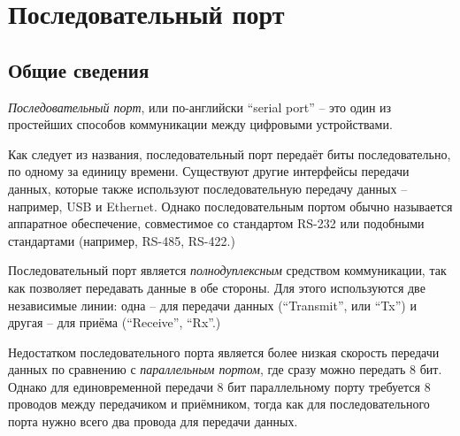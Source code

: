 \documentclass[../sparc.tex]{subfiles}
\begin{document}
\section{Последовательный порт}
\label{section:serial-port}

\subsection{Общие сведения}

\emph{Последовательный порт}, или по-английски ``serial port'' -- это один из
простейших способов коммуникации между цифровыми устройствами.

Как следует из названия, последовательный порт передаёт биты последовательно, по
одному за единицу времени.  Существуют другие интерфейсы передачи данных,
которые также используют последовательную передачу данных -- например, USB и
Ethernet.  Однако последовательным портом обычно называется аппаратное
обеспечение, совместимое со стандартом RS-232 или подобными стандартами
(например, RS-485, RS-422.)

Последовательный порт является \emph{полнодуплексным} средством коммуникации,
так как позволяет передавать данные в обе стороны.  Для этого используются две
независимые линии: одна -- для передачи данных (``Transmit'', или ``Tx'') и
другая -- для приёма (``Receive'', ``Rx''.)

Недостатком последовательного порта является более низкая скорость передачи
данных по сравнению с \emph{параллельным портом}, где сразу можно передать 8
бит.  Однако для единовременной передачи 8 бит параллельному порту требуется 8
проводов между передачиком и приёмником, тогда как для последовательного порта
нужно всего два провода для передачи данных.
\end{document}
